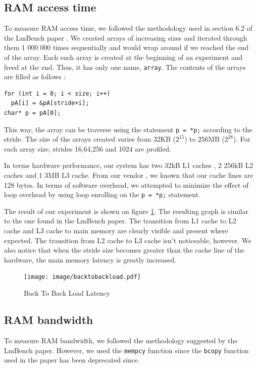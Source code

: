 \subsection{RAM access time}

To measure RAM access time, we followed the methodology used in section 6.2 of the LmBench paper \cite{lmbench}. We created arrays of increasing sizes and iterated through them 1 000 000 times sequentially and would wrap around if we reached the end of the array. Each such array is created at the beginning of an experiment and freed at the end. Thus, it has only one name, \texttt{array}. The contents of the arrays are filled as follows :

\begin{lstlisting}
for (int i = 0; i < size; i++)
  pA[i] = &pA[stride+i];
char* p = pA[0];
\end{lstlisting}

This way, the array can be traverse using the statement \texttt{p = *p;} according to the stride. The size of the arrays created varies from 32KB ($2^{15}$) to 256MB ($2^{28}$). For each array size, strides 16,64,256 and 1024 are profiled. 

In terms hardware performance, our system has two 32kB L1 caches , 2 256kB L2 caches and 1 3MB L3 cache. From our vendor \cite{vendor}, we known that our cache lines are 128 bytes. In terms of software overhead, we attempted to minimize the effect of loop overhead by using loop enrolling on the \texttt{p = *p;} statement.

The result of our experiment is shown on figure \ref{fig:b2blatency}. The resulting graph is similar to the one found in the LmBench paper. The transition from L1 cache to L2 cache and L3 cache to main memory are clearly visible and present where expected. The transition from L2 cache to L3 cache isn't noticeable, however. We also notice that when the stride size becomes greater than the cache line of the hardware, the main memory latency is greatly increased.

\begin{figure}
 \centering
  \texttt{[image: image/backtobackload.pdf]}
  \caption{Back To Back Load Latency}
 \label{fig:b2blatency}
\end{figure}

\subsection{RAM bandwidth}

To measure RAM bandwidth, we followed the methodology suggested by the LmBench paper. However, we used the \texttt{mempcy} function since the \texttt{bcopy} function used in the paper has been deprecated since.

